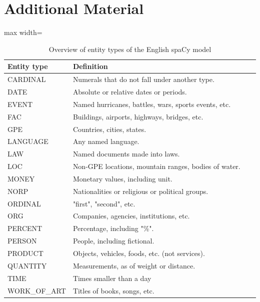\chapter{Additional Material}
\label{additional_material}


\begin{table}[htp]
\caption{Overview of entity types of the English spaCy model}
\label{tab:spacy_ents_def}
\centering
\begin{adjustbox}{max width=\textwidth}
\begin{tabular}{|p{0.25\linewidth}|p{0.75\linewidth}|}
\hline
\textbf{Entity type} & \textbf{Definition} \\
\hline 
CARDINAL & Numerals that do not fall under another type. \\
\hline 
DATE & Absolute or relative dates or periods. \\
\hline 
EVENT & Named hurricanes, battles, wars, sports events, etc. \\
\hline 
FAC & Buildings, airports, highways, bridges, etc. \\
\hline 
GPE & Countries, cities, states. \\
\hline 
LANGUAGE & Any named language. \\
\hline 
LAW & Named documents made into laws. \\
\hline 
LOC & Non-GPE locations, mountain ranges, bodies of water. \\
\hline 
MONEY & Monetary values, including unit. \\
\hline  
NORP & Nationalities or religious or political groups. \\
\hline 
ORDINAL & "first", "second", etc. \\
\hline 
ORG & Companies, agencies, institutions, etc. \\
\hline 
PERCENT & Percentage, including "\%".  \\
\hline 
PERSON & People, including fictional. \\
\hline 
PRODUCT & Objects, vehicles, foods, etc. (not services). \\
\hline 
QUANTITY & Measurements, as of weight or distance. \\
\hline 
TIME & Times smaller than a day \\
\hline 
WORK\_OF\_ART & Titles of books, songs, etc.\\
\hline 
\end{tabular}
\end{adjustbox}
\end{table}


